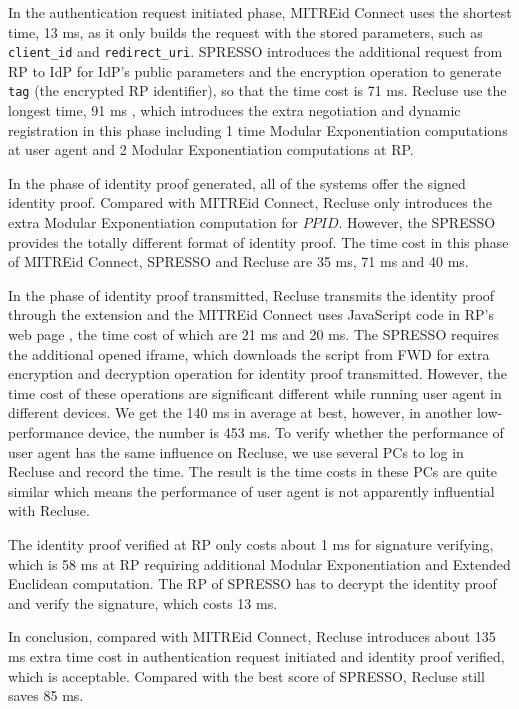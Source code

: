 In the authentication request initiated phase, MITREid Connect uses the shortest time, 13 ms, as it only builds the request with the stored parameters, such as \verb+client_id+ and \verb+redirect_uri+. SPRESSO introduces the additional request from RP to IdP for IdP's public parameters and the encryption operation to generate \verb+tag+ (the encrypted RP identifier), so that the time cost is 71 ms. Recluse use the longest time, 91 ms , which introduces the extra negotiation and dynamic registration in this phase including 1 time Modular Exponentiation computations at user agent and 2 Modular Exponentiation computations at RP. 

In the phase of identity proof generated, all of the systems offer the signed identity proof. Compared with MITREid Connect, Recluse only introduces the extra Modular Exponentiation computation for $PPID$. However, the SPRESSO provides the totally different format of identity proof. The time cost in this phase of MITREid Connect, SPRESSO and Recluse are 35 ms, 71 ms and 40 ms.

In the phase of identity proof transmitted, Recluse transmits the identity proof through the extension and the MITREid Connect uses JavaScript code in RP's web page , the time cost of which are 21 ms and 20 ms. The SPRESSO requires the additional opened iframe, which downloads the script from FWD for extra encryption and decryption operation for identity proof transmitted. However, the time cost of these operations are significant different while running user agent in different devices. We get the 140 ms in average at best, however, in another low-performance device, the number is 453 ms. To verify whether the performance of user agent has the same influence on Recluse, we use several PCs to log in Recluse and record the time. The result is the time costs in these PCs are quite similar which means the performance of user agent is not apparently influential with Recluse. 

The identity proof verified at RP only costs about 1 ms for signature verifying, which is 58 ms at RP requiring additional Modular Exponentiation and Extended Euclidean computation. The RP of SPRESSO has to decrypt the identity proof and verify the signature, which costs 13 ms. 

In conclusion, compared with MITREid Connect, Recluse introduces about 135 ms extra time cost in authentication request initiated and identity proof verified, which is acceptable. Compared with the best score of SPRESSO, Recluse still saves 85 ms.   

